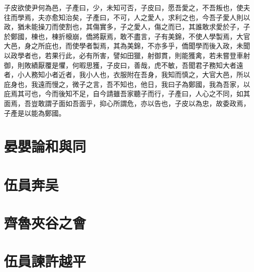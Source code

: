 \documentclass{article}
\begin{document}
子皮欲使尹何為邑，子產曰，少，未知可否，子皮曰，愿吾愛之，不吾叛也，使夫往而學焉，夫亦愈知治矣，子產曰，不可，人之愛人，求利之也，今吾子愛人則以政，猶未能操刀而使割也，其傷實多，子之愛人，傷之而已，其誰敢求愛於子，子於鄭國，棟也，棟折榱崩，僑將厭焉，敢不盡言，子有美錦，不使人學製焉，大官大邑，身之所庇也，而使學者製焉，其為美錦，不亦多乎，僑聞學而後入政，未聞以政學者也，若果行此，必有所害，譬如田獵，射御貫，則能獲禽，若未嘗登車射御，則敗績厭覆是懼，何暇思獲，子皮曰，善哉，虎不敏，吾聞君子務知大者遠者，小人務知小者近者，我小人也，衣服附在吾身，我知而慎之，大官大邑，所以庇身也，我遠而慢之，微子之言，吾不知也，他日，我曰子為鄭國，我為吾家，以庇焉其可也，今而後知不足，自今請雖吾家聽子而行，子產曰，人心之不同，如其面焉，吾豈敢謂子面如吾面乎，抑心所謂危，亦以告也，子皮以為忠，故委政焉，子產是以能為鄭國。
\section{晏嬰論和與同}

\section{伍員奔吴}

\section{齊魯夾谷之會}

\section{伍員諫許越平}
\end{document}
